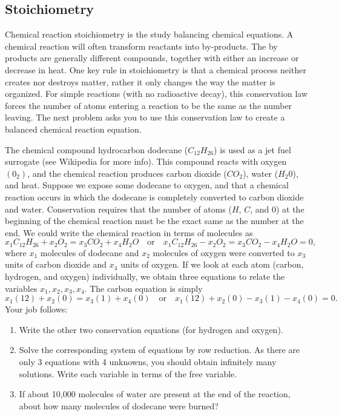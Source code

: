 \subsection{Stoichiometry}
Chemical reaction stoichiometry is the study balancing chemical equations. A chemical reaction will often transform reactants into by-products. The by products are generally different compounds, together with either an increase or decrease in heat. One key rule in stoichiometry is that a chemical process neither creates nor destroys matter, rather it only changes the way the matter is organized. For simple reactions (with no radioactive decay), this conservation law forces the number of atoms entering a reaction to be the same as the number leaving. The next problem asks you to use this conservation law to create a balanced chemical reaction equation. 
\begin{problem}
 The chemical compound hydrocarbon dodecane ($C_{12}H_{26}$) is used as a jet fuel surrogate (see Wikipedia for more info).  This compound reacts with oxygen $(0_2)$, and the chemical reaction produces carbon dioxide ($CO_2$), water ($H_2 0$), and heat.  Suppose we expose some dodecane to oxygen, and that a chemical reaction occurs in which the dodecane is completely converted to carbon dioxide and water.  
 Conservation requires that the number of atoms ($H$, $C$, and $0$) at the beginning of the chemical reaction must be the exact same as the number at the end. 
 We could write the chemical reaction in terms of molecules as
 $$x_1 C_{12}H_{26} +x_2 O_2 = x_3 CO_2+ x_4 H_2O\quad \text{or} \quad x_1 C_{12}H_{26} -x_2 O_2 = x_3 CO_2- x_4 H_2O=0, $$
 where $x_1$ molecules of dodecane and $x_2$ molecules of oxygen were converted to $x_3$ units of carbon dioxide and $x_4$ units of oxygen.  
 If we look at each atom (carbon, hydrogen, and oxygen) individually, we obtain three equations to relate the variables $x_1, x_2, x_3, x_4$.  The carbon equation is simply
 $$x_1(12) + x_2(0) = x_3(1)+x_4(0) \quad \text{or}\quad x_1(12) + x_2(0) - x_3(1)-x_4(0)=0.$$  
 Your job follows:
\begin{enumerate}
 \item Write the other two conservation equations (for hydrogen and oxygen). 
 \item Solve the corresponding system of equations by row reduction.  As there are only 3 equations with 4 unknowns, you should obtain infinitely many solutions. Write each variable in terms of the free variable.  
 \item If about 10,000 molecules of water are present at the end of the reaction, about how many molecules of dodecane were burned? 
\end{enumerate}
\end{problem}





